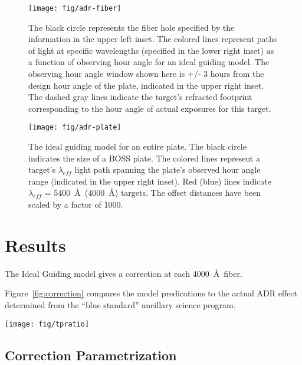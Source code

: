 \documentclass[useAMS,usenatbib]{mn2e}
\providecommand{\fig}[1]{Figure~\ref{fig:#1}}
\begin{document}
\begin{figure}
\centering
\texttt{[image: fig/adr-fiber]}
\caption{The black circle represents the fiber hole specified by the information in the upper left inset. The colored lines represent paths of light at specific wavelengths (specified in the lower right inset) as a function of observing hour angle for an ideal guiding model. The observing hour angle window shown here is +/- 3 hours from the design hour angle of the plate, indicated in the upper right inset. The dashed gray lines indicate the target's refracted footprint corresponding to the hour angle of actual exposures for this target.}
\label{fig:fiber_hole}
\end{figure}

\begin{figure}
\centering
\texttt{[image: fig/adr-plate]}
\caption{The ideal guiding model for an entire plate. The black circle indicates the size of a BOSS plate. The colored lines represent a target's $\lambda_{eff}$ light path spanning the plate's observed hour angle range (indicated in the upper right inset). Red (blue) lines indicate $\lambda_{eff}$ = 5400~\AA~(4000~\AA) targets. The offset distances have been scaled by a factor of 1000.}
\label{fig:plate_guide}
\end{figure}

\section{Results}

The Ideal Guiding model gives a correction at each 4000~\AA~fiber. 

\fig{correction} compares the model predications to the actual ADR effect determined from the ``blue standard'' ancillary science program.

\begin{figure*}
\centering
\texttt{[image: fig/tpratio]}
\caption{The corrections for all $\lambda_{eff}$ = 4000~\AA~targets on a plate using the mean observing hour angle and mean PSF size. The transparent lines correspond to correction curves for individual targets while the thick opaque lines correspond the coadded spectrum ratios of the standard and alternate reductions for ancillary targets on this plate. The blue and red colors indicate fibers 1-500 and 501-1000 respectively.}
\label{fig:correction}
\end{figure*}

\subsection{Correction Parametrization}
\end{document}
